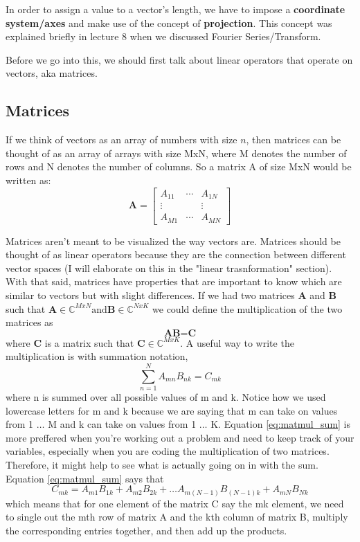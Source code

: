 \documentclass{article}
\newcommand{\be}{\begin{equation}}
\newcommand{\ee}{\end{equation}}
\begin{document}
In order to assign a value to a vector's length, we have to impose a \textbf{coordinate system/axes} and make use of the concept of \textbf{projection}.
This concept was explained briefly in lecture 8 when we discussed Fourier Series/Transform.

Before we go into this, we should first talk about linear operators that operate on vectors, aka matrices.
\subsection*{Matrices}
If we think of vectors as an array of numbers with size $n$, then matrices can be thought of as an array of arrays with size MxN, where M denotes the number of rows and N denotes the number of columns.
So a matrix A of size MxN would be written as:
\[
\textbf{A} =
\begin{bmatrix}
  A_{11} & \cdots & A_{1N} \\
  \vdots & & \vdots \\
  A_{M1} & \cdots & A_{MN}
\end{bmatrix}
\]

Matrices aren't meant to be visualized the way vectors are.
Matrices should be thought of as linear operators because they are the connection between different vector spaces (I will elaborate on this in the "linear trasnformation" section).
With that said, matrices have properties that are important to know which are similar to vectors but with slight differences.
If we had two matrices \textbf{A} and \textbf{B} such that $\textbf{A} \in \mathbb{C}^{MxN} \text{and} \textbf{B} \in \mathbb{C}^{NxK}$ we could define the multiplication of the two matrices as
\be \label{eq:matmul}
  \textbf{A} \textbf{B} = \textbf{C}
\ee
where \textbf{C} is a matrix such that $\textbf{C} \in \mathbb{C}^{MxK}$.
A useful way to write the multiplication is with summation notation,
\be \label{eq:matmul_sum}
  \sum\limits_{n=1}^{N} A_{mn} B_{nk} = C_{mk}
\ee
where n is summed over all possible values of m and k.
Notice how we used lowercase letters for m and k because we are saying that m can take on values from 1 $\hdots$ M and k can take on values from 1 $\hdots$ K.
Equation \ref{eq:matmul_sum} is more preffered when you're working out a problem and need to keep track of your variables, especially when you are coding the multiplication of two matrices.
Therefore, it might help to see what is actually going on in with the sum.
Equation \ref{eq:matmul_sum} says that
\be
  C_{mk} = A_{m1} B_{1k} + A_{m2} B_{2k} + \hdots A_{m(N-1)} B_{(N-1)k} + A_{mN} B_{Nk}
\ee
which means that for one element of the matrix C say the mk element, we need to single out the mth row of matrix A and the kth column of matrix B, multiply the corresponding entries together, and then add up the products.
\end{document}
